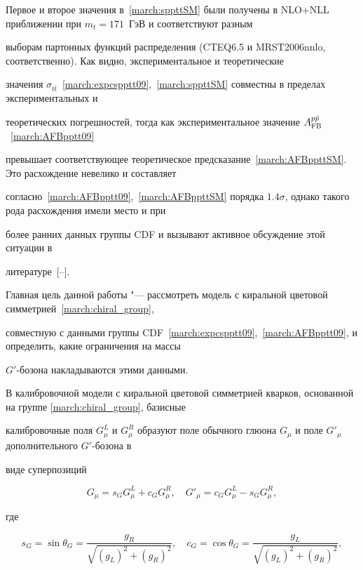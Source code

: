%

Первое и второе значения в~\eqref{march:sppttSM} были получены в NLO+NLL приближении при $m_t=171$~ГэВ и соответствуют разным

выборам партонных функций распределения  (CTEQ6.5 и MRST2006nnlo, соответственно). Как видно, экспериментальное и теоретические

значения $\sigma_{t\bar{t}}$~\eqref{march:expcspptt09},~\eqref{march:sppttSM} совместны в пределах экс\-пе\-ри\-мен\-таль\-ных и

тео\-ре\-тических пог\-реш\-ностей, тогда как экспериментальное значение $A_{\rm FB}^{p \bar p}$~\eqref{march:AFBpptt09}

превышает соответствующее теоретическое предсказание~\eqref{march:AFBppttSM}. Это расхождение невелико и составляет

согласно~\eqref{march:AFBpptt09},~\eqref{march:AFBppttSM} порядка $1.4 \sigma$, однако такого рода расхождения имели место и при

более ранних данных группы CDF и вызывают активное обсуждение этой ситуации в

литературе~[--].



Главная цель данной работы "--- рас\-смот\-реть модель с ки\-ральной цве\-товой сим\-мет\-рией~\eqref{march:chiral_group},

совместную с данными группы CDF~\eqref{march:expcspptt09},~\eqref{march:AFBpptt09}, и определить, какие ограничения на массы

$G'$-бозона накладываются этими данными.



В калибровочной модели с киральной цветовой симметрией кварков, основанной на группе \eqref{march:chiral_group}, базисные

калибровочные поля $G^L_\mu$ и $G^R_\mu$ образуют поле обычного глюона $G_\mu$  и поле  $G'_\mu$ дополнительного $G'$-бозона в

виде суперпозиций

\begin{equation}

G_\mu  = s_G G^L_\mu + c_G G^R_\mu, \quad

G'_\mu = c_G G^L_\mu - s_G G^R_\mu,

\end{equation}

где

\begin{equation}

s_G =\sin\theta_G = \frac{g_R}{\sqrt{(g_L)^2+(g_R)^2}},  \quad  c_G =\cos\theta_G = \frac{g_L}{\sqrt{(g_L)^2+(g_R)^2}},

\label{march:eq:sGcG}

\end{equation}

